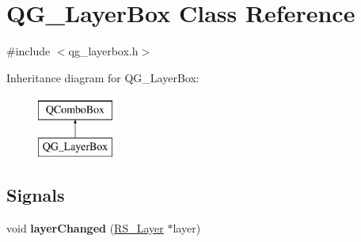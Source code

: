 \hypertarget{classQG__LayerBox}{\section{Q\-G\-\_\-\-Layer\-Box Class Reference}
\label{classQG__LayerBox}
}


{\ttfamily \#include $<$qg\-\_\-layerbox.\-h$>$}

Inheritance diagram for Q\-G\-\_\-\-Layer\-Box\-:\begin{figure}[H]
\begin{center}
\leavevmode
\includegraphics[height=2.000000cm]{classQG__LayerBox}
\end{center}
\end{figure}
\subsection*{Signals}
\begin{DoxyCompactItemize}
\item 
\hypertarget{classQG__LayerBox_ada2e247e1c116e892eb2324f5e420beb}{void {\bfseries layer\-Changed} (\hyperlink{classRS__Layer}{R\-S\-\_\-\-Layer} $\ast$layer)}\label{classQG__LayerBox_ada2e247e1c116e892eb2324f5e420beb}

\end{DoxyCompactItemize}

